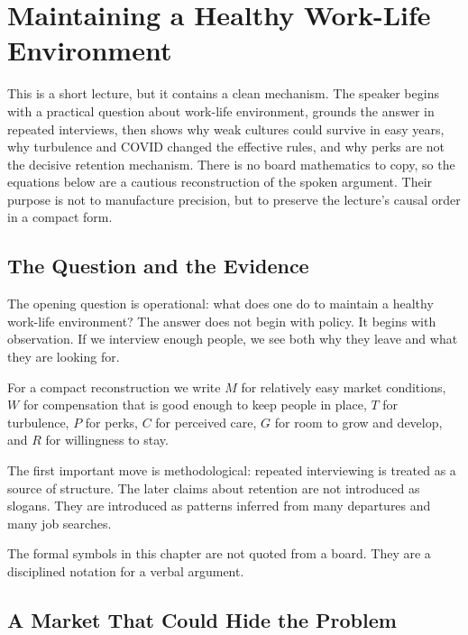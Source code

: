 \chapter{Maintaining a Healthy Work-Life Environment}

This is a short lecture, but it contains a clean mechanism. The speaker begins with a practical question about work-life environment, grounds the answer in repeated interviews, then shows why weak cultures could survive in easy years, why turbulence and COVID changed the effective rules, and why perks are not the decisive retention mechanism. There is no board mathematics to copy, so the equations below are a cautious reconstruction of the spoken argument. Their purpose is not to manufacture precision, but to preserve the lecture's causal order in a compact form.

\section{The Question and the Evidence}

The opening question is operational: what does one do to maintain a healthy work-life environment? The answer does not begin with policy. It begins with observation. If we interview enough people, we see both why they leave and what they are looking for.

\begin{definition}
For a compact reconstruction we write \(M\) for relatively easy market conditions, \(W\) for compensation that is good enough to keep people in place, \(T\) for turbulence, \(P\) for perks, \(C\) for perceived care, \(G\) for room to grow and develop, and \(R\) for willingness to stay.
\end{definition}

The first important move is methodological: repeated interviewing is treated as a source of structure. The later claims about retention are not introduced as slogans. They are introduced as patterns inferred from many departures and many job searches.

\begin{remark}
The formal symbols in this chapter are not quoted from a board. They are a disciplined notation for a verbal argument.
\end{remark}

\section{A Market That Could Hide the Problem}

